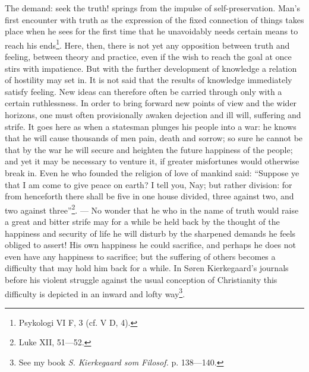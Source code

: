 \documentclass[12pt,a4paper,openany]{book}
\newcommand{\opage}[1]{\marginnote{\footnotesize\textit{[#1]}}}
\begin{document}
The demand: seek the truth! springs from the impulse of self-preservation. Man's first encounter with truth as the
expression of the fixed connection of things takes place when he sees for the first time that he unavoidably needs
certain means to reach his ends\footnote[2]{Psykologi VI F, 3 (cf. V D, 4).}. Here, then, there is not yet any
opposition between truth and feeling, between theory and practice, even if the wish to reach the goal at once stirs with
impatience. But with the further development of knowledge a relation of hostility may set in. It is not said that the
results of knowledge immediately satisfy feeling. New ideas can therefore often be carried through only with a certain
ruthlessness. In order to bring forward new points of view and the wider horizons, one must often provisionally awaken
dejection and ill will, suffering and strife. It goes here as when a statesman plunges his people into a war: he knows
that he will cause thousands of men pain, death and sorrow; so sure he cannot be that by the war he will secure and
heighten the future happiness of the people; and yet it may be necessary to venture it, if greater misfortunes would
otherwise break in. Even he who founded the religion of love of mankind said: ``Suppose ye that I am come to give peace
on earth? I tell you,
\opage{251}Nay; but rather division: for from henceforth there shall be five in one house divided, three against two, and
two against three''\footnote[1]{Luke XII, 51---52.}. %
--- No wonder that he who in the name of truth would raise a great and bitter strife may for a while be held back by the
thought of the happiness and security of life he will disturb by the sharpened demands he feels obliged to assert! His
own happiness he could sacrifice, and perhaps he does not even have any happiness to sacrifice; but the suffering of
others becomes a difficulty that may hold him back for a while. In Søren Kierkegaard's journals before his violent
struggle against the usual conception of Christianity this difficulty is depicted in an inward and lofty
way\footnote[2]{See my book \textit{S. Kierkegaard som Filosof.} p. 138---140.}.
\end{document}
